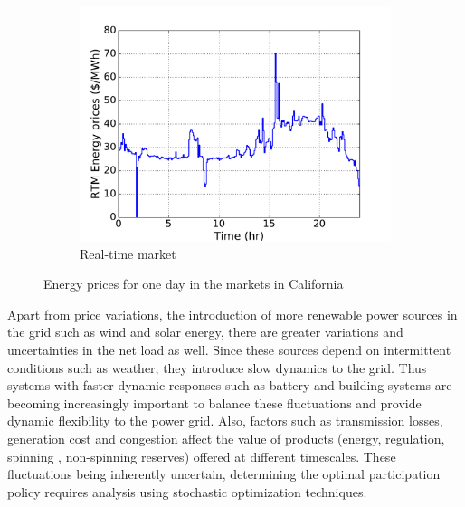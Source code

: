 \documentclass[11pt,twoside]{article}
\begin{document}
\begin{figure}[h!tp]
\begin{subfigure}[b]{0.32\textwidth} \includegraphics[width=\textwidth]{Figures/rtmprices.pdf} \caption{Real-time market}\label{rtmprices}\end{subfigure} \hfill
\caption{Energy prices for one day in the markets in California}\label{eprices}
\end{figure}



Apart from price variations, the introduction of more renewable power sources in the grid such as wind and solar energy, there are greater variations and uncertainties in the net load as well. Since these sources depend on intermittent conditions such as weather, they introduce slow dynamics to the grid. Thus systems with faster dynamic responses such as battery and building systems are becoming increasingly important to balance these fluctuations and provide dynamic flexibility to the power grid. Also, factors such as transmission losses, generation cost and congestion affect the value of products (energy, regulation, spinning , non-spinning reserves) offered at different timescales. These fluctuations being inherently uncertain, determining the optimal participation policy requires analysis using stochastic optimization techniques.
\end{document}
